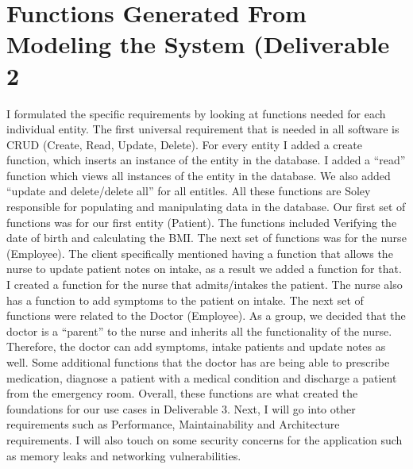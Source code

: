 \documentclass{article}
\begin{document}
\section{Functions Generated From Modeling the System (Deliverable 2}
\begin{multicols}{2}

I formulated the specific requirements by looking at functions needed for each individual entity. The first universal requirement that is needed in all software is CRUD (Create, Read, Update, Delete). For every entity I added a create function, which inserts an instance of the entity in the database. I added a “read” function which views all instances of the entity in the database. We also added “update and delete/delete all” for all entitles. All these functions are Soley responsible for populating and manipulating data in the database. Our first set of functions was for our first entity (Patient). The functions included Verifying the date of birth and calculating the BMI. The next set of functions was for the nurse (Employee). The client specifically mentioned having a function that allows the nurse to update patient notes on intake, as a result we added a function for that. I created a function for the nurse that admits/intakes the patient. The nurse also has a function to add symptoms to the patient on intake. The next set of functions were related to the Doctor (Employee). As a group, we decided that the doctor is a “parent” to the nurse and inherits all the functionality of the nurse. Therefore, the doctor can add symptoms, intake patients and update notes as well. Some additional functions that the doctor has are being able to prescribe medication, diagnose a patient with a medical condition and discharge a patient from the emergency room. Overall, these functions are what created the foundations for our use cases in Deliverable 3. Next, I will go into other requirements such as Performance, Maintainability and Architecture requirements. I will also touch on some security concerns for the application such as memory leaks and networking vulnerabilities.  

\end{multicols}
\end{document}
